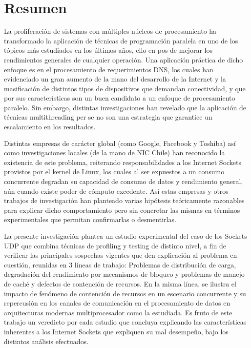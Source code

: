 \section*{Resumen}
La proliferación de sistemas con múltiples núcleos de procesamiento ha transformado la aplicación de técnicas de programación paralela en uno de los tópicos más estudiados en los últimos años, ello en pos de mejorar los rendimientos generales de cualquier operación. Una aplicación práctica de dicho enfoque es en el procesamiento de requerimientos DNS, los cuales han evidenciado un gran aumento de la mano del desarrollo de la Internet y la masificación de distintos tipos de dispositivos que demandan conectividad, y que por sus características son un buen candidato a un enfoque de procesamiento paralelo. Sin embargo, distintas investigaciones han revelado que la aplicación de técnicas multithreading per se no son una estrategia que garantice un escalamiento en los resultados.

Distintas empresas de carácter global (como Google, Facebook y Toshiba) así como investigaciones locales (de la mano de NIC Chile) han reconocido la existencia de este problema, reiterando responsabilidades a los Internet Sockets provistos por el kernel de Linux, los cuales al ser expuestos a un consumo concurrente degradan su capacidad de consumo de datos y rendimiento general, aún cuando existe poder de cómputo excedente. Así estas empresas y otros trabajos de investigación han planteado varias hipótesis teóricamente razonables para explicar dicho comportamiento pero sin concretar las mismas en términos experimentales que permitan confirmarlas o desmentirlas. 

La presente investigación plantea un estudio experimental del caso de los Sockets UDP que combina técnicas de profiling y testing de distinto nivel, a fin de verificar las principales sospechas vigentes que den explicación al problema en cuestión, reunidas en 3 líneas de trabajo: Problemas de distribución de carga, degradación del rendimiento por mecanismos de bloqueo y problemas de manejo de caché y defectos de contención de recursos. En la misma línea, se ilustra el impacto de fenómeno de contención de recursos en un escenario concurrente y su repercusión en los canales de comunicación en el procesamiento de datos en arquitecturas modernas multiprocesador como la estudiada. Es fruto de este trabajo un veredicto por cada estudio que concluya explicando las características inherentes a los Internet Sockets que expliquen su mal desempeño, bajo los distintos análisis efectuados. 

